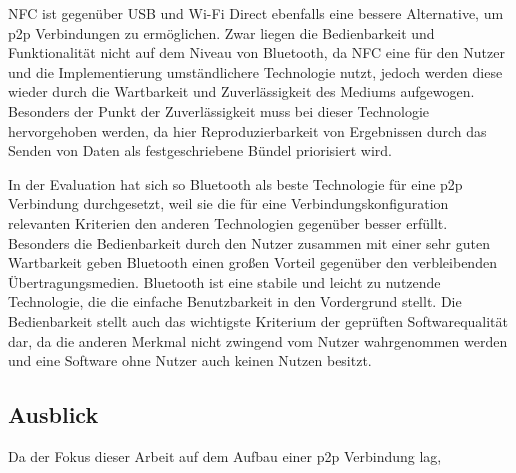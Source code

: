 NFC ist gegenüber USB und Wi-Fi Direct ebenfalls eine bessere Alternative, um p2p Verbindungen zu ermöglichen. Zwar liegen die Bedienbarkeit und Funktionalität nicht auf dem Niveau von Bluetooth, da NFC eine für den Nutzer und die Implementierung umständlichere Technologie nutzt, jedoch werden diese wieder durch die Wartbarkeit und Zuverlässigkeit des Mediums aufgewogen. Besonders der Punkt der Zuverlässigkeit muss bei dieser Technologie hervorgehoben werden, da hier Reproduzierbarkeit von Ergebnissen durch das Senden von Daten als festgeschriebene Bündel priorisiert wird.

In der Evaluation hat sich so Bluetooth als beste Technologie für eine p2p Verbindung durchgesetzt, weil sie die für eine Verbindungskonfiguration relevanten Kriterien den anderen Technologien gegenüber besser erfüllt. Besonders die Bedienbarkeit durch den Nutzer zusammen mit einer sehr guten Wartbarkeit geben Bluetooth einen großen Vorteil gegenüber den verbleibenden Übertragungsmedien. Bluetooth ist eine stabile und leicht zu nutzende Technologie, die die einfache Benutzbarkeit in den Vordergrund stellt. Die Bedienbarkeit stellt auch das wichtigste Kriterium  der geprüften Softwarequalität dar, da die anderen Merkmal nicht zwingend vom Nutzer wahrgenommen werden und eine Software ohne Nutzer auch keinen Nutzen besitzt.

\subsection{Ausblick}

Da der Fokus dieser Arbeit auf dem Aufbau einer p2p Verbindung lag, 